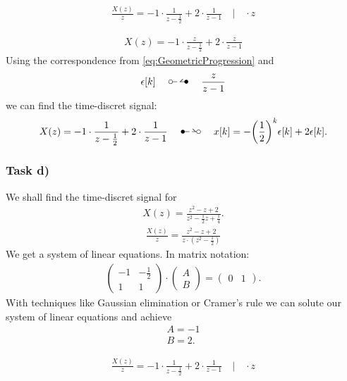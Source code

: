 \begin{align}
	\frac{X(z)}{z}=-1\cdot\frac{1}{z-\frac{1}{2}}+2\cdot\frac{1}{z-1} \quad\Bigg | \quad \cdot z
\end{align}

\begin{align}
	X(z)=-1\cdot\frac{z}{z-\frac{1}{2}}+2\cdot\frac{z}{z-1}
\end{align}
Using the correspondence from \ref{eq:GeometricProgression} and 
\begin{align}
	\epsilon[k]\quad\ztransf\quad\frac{z}{z-1}
\end{align}
we can find the time-discret signal:
\begin{align}
	X(z)=-1\cdot\frac{1}{z-\frac{1}{2}}+2\cdot\frac{1}{z-1}\quad\Ztransf\quad x[k]=-\bigg(\frac{1}{2}\bigg)^k\epsilon[k]+2\epsilon[k].
\end{align}
\subsubsection{Task d)}
We shall find the time-discret signal for
\begin{align}
	X(z)=\frac{z^2-z+2}{z^2-\frac{1}{2}z+\frac{1}{4}}.
\end{align}
\begin{align}
	\frac{X(z)}{z}=\frac{z^2-z+2}{z\cdot(z^2-\frac{1}{2})}
\end{align}
We get a system of linear equations. In matrix notation:
\begin{align}
	\begin{pmatrix}
		-1 & -\frac{1}{2} \\
		1 & 1
	\end{pmatrix}
	\cdot
	\begin{pmatrix}
		A \\ B
	\end{pmatrix}
	=
	\begin{pmatrix}
		0 & 1
	\end{pmatrix}.
\end{align}
With techniques like Gaussian elimination or Cramer's rule we can solute our system of linear equations and achieve
\begin{align}
	A = -1 \nonumber \\
	B = 2.
\end{align}

\begin{align}
	\frac{X(z)}{z}=-1\cdot\frac{1}{z-\frac{1}{2}}+2\cdot\frac{1}{z-1} \quad\Bigg | \quad \cdot z
\end{align}

